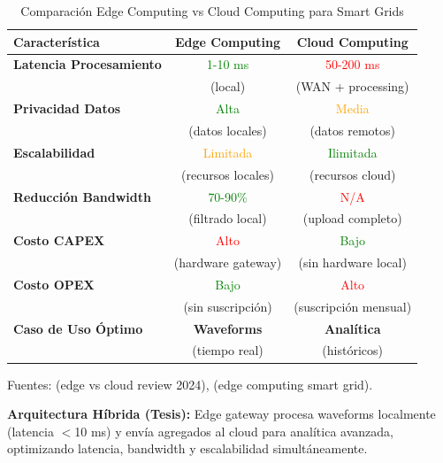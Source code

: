 
\begin{table}[htbp]
\centering
\caption{Comparación Edge Computing vs Cloud Computing para Smart Grids}
\label{tab:edge_vs_cloud_comparison}
\begin{tabular}{|l|c|c|}
\hline
\textbf{Característica} & \textbf{Edge Computing} & \textbf{Cloud Computing} \\
\hline
\hline
\textbf{Latencia Procesamiento} & \textcolor{green}{1-10 ms} & \textcolor{red}{50-200 ms} \\
& (local) & (WAN + processing) \\
\hline
\textbf{Privacidad Datos} & \textcolor{green}{Alta} & \textcolor{orange}{Media} \\
& (datos locales) & (datos remotos) \\
\hline
\textbf{Escalabilidad} & \textcolor{orange}{Limitada} & \textcolor{green}{Ilimitada} \\
& (recursos locales) & (recursos cloud) \\
\hline
\textbf{Reducción Bandwidth} & \textcolor{green}{70-90\%} & \textcolor{red}{N/A} \\
& (filtrado local) & (upload completo) \\
\hline
\textbf{Costo CAPEX} & \textcolor{red}{Alto} & \textcolor{green}{Bajo} \\
& (hardware gateway) & (sin hardware local) \\
\hline
\textbf{Costo OPEX} & \textcolor{green}{Bajo} & \textcolor{red}{Alto} \\
& (sin suscripción) & (suscripción mensual) \\
\hline
\textbf{Caso de Uso Óptimo} & \textbf{Waveforms} & \textbf{Analítica} \\
& (tiempo real) & (históricos) \\
\hline
\end{tabular}
\medskip

\small
Fuentes: \cite{andriuloEdgeComputingCloud2024} (edge vs cloud review 2024), 
\cite{minhEdgeComputingIoTEnabled2022} (edge computing smart grid).

\medskip
\textbf{Arquitectura Híbrida (Tesis):} Edge gateway procesa waveforms localmente 
(latencia $<$10 ms) y envía agregados al cloud para analítica avanzada, optimizando 
latencia, bandwidth y escalabilidad simultáneamente.
\end{table}

